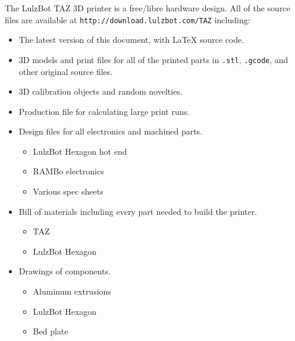 %
%
%
%
%

The LulzBot\textsuperscript{\miniscule{\texttrademark}} TAZ 3D printer is a free/libre hardware design. All of the source files are available at \texttt{http://download.lulzbot.com/TAZ} including:

\begin{itemize}
\item The latest version of this document, with {\LaTeX} source code.

\item 3D models and print files for all of the printed parts in \texttt{.stl}, \texttt{.gcode}, and other original source files.

\item 3D calibration objects and random novelties.

\item Production file for calculating large print runs.

\item Design files for all electronics and machined parts.

\begin{itemize} %
\item LulzBot\textsuperscript{\miniscule{\texttrademark}} Hexagon hot end
\item RAMBo electronics
\item Various spec sheets
\end{itemize} %

\item Bill of materials including every part needed to build the printer.
\begin{itemize} %
\item TAZ
\item LulzBot\textsuperscript{\miniscule{\texttrademark}} Hexagon
\end{itemize} %

\item Drawings of components.
\begin{itemize} %
\item Aluminum extrusions
\item LulzBot\textsuperscript{\miniscule{\texttrademark}} Hexagon
\item Bed plate
\end{itemize} %


\end{itemize}
